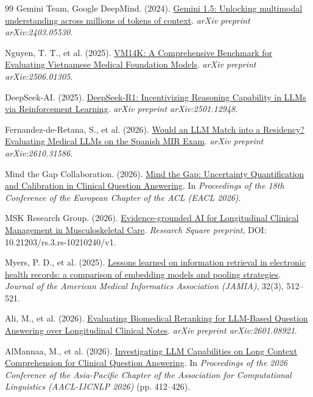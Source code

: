 \begin{thebibliography}{99}
Gemini Team, Google DeepMind. (2024).
\href{https://arxiv.org/abs/2403.05530}{Gemini 1.5: Unlocking multimodal understanding across millions of tokens of context}.
\textit{arXiv preprint arXiv:2403.05530}.

Nguyen, T. T., et al. (2025).
\href{https://arxiv.org/abs/2506.01305}{VM14K: A Comprehensive Benchmark for Evaluating Vietnamese Medical Foundation Models}.
\textit{arXiv preprint arXiv:2506.01305}.

DeepSeek-AI. (2025).
\href{https://arxiv.org/abs/2501.12948}{DeepSeek-R1: Incentivizing Reasoning Capability in LLMs via Reinforcement Learning}.
\textit{arXiv preprint arXiv:2501.12948}.

Fernandez-de-Retana, S., et al. (2026).
\href{https://arxiv.org/abs/2610.31586}{Would an LLM Match into a Residency? Evaluating Medical LLMs on the Spanish MIR Exam}.
\textit{arXiv preprint arXiv:2610.31586}.

Mind the Gap Collaboration. (2026).
\href{https://aclanthology.org/2026.eacl-long.106/}{Mind the Gap: Uncertainty Quantification and Calibration in Clinical Question Answering}.
In \textit{Proceedings of the 18th Conference of the European Chapter of the ACL (EACL 2026)}.

MSK Research Group. (2026).
\href{https://doi.org/10.21203/rs.3.rs-10210240/v1}{Evidence-grounded AI for Longitudinal Clinical Management in Musculoskeletal Care}.
\textit{Research Square preprint}, DOI: 10.21203/rs.3.rs-10210240/v1.

Myers, P. D., et al. (2025).
\href{https://doi.org/10.1093/jamia/ocaf012}{Lessons learned on information retrieval in electronic health records: a comparison of embedding models and pooling strategies}.
\textit{Journal of the American Medical Informatics Association (JAMIA)}, 32(3), 512--521.

Ali, M., et al. (2026).
\href{https://arxiv.org/abs/2601.08921}{Evaluating Biomedical Reranking for LLM-Based Question Answering over Longitudinal Clinical Notes}.
\textit{arXiv preprint arXiv:2601.08921}.

AlMannaa, M., et al. (2026).
\href{https://aclanthology.org/2026.aacl-long.45/}{Investigating LLM Capabilities on Long Context Comprehension for Clinical Question Answering}.
In \textit{Proceedings of the 2026 Conference of the Asia-Pacific Chapter of the Association for Computational Linguistics (AACL-IJCNLP 2026)} (pp. 412--426).


\end{thebibliography}
